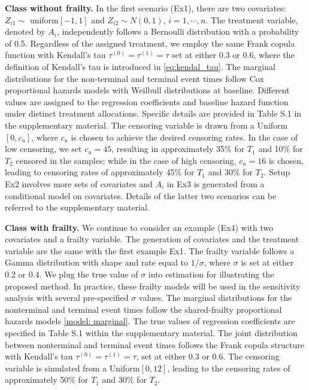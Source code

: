 \documentclass[APA,Times1COL]{WileyNJDv5} %
\theoremstyle{plain}
\begin{document}
\iffalse
\textbf{Class without frailty.}
In the first scenario (Ex1), there are two covariates:  $Z_{i1}\sim$ uniform$[-1,1]$ and $Z_{i2}\sim N(0,1)$, $i=1,\cdots,n$. The treatment variable, denoted by $A_i$, independently follows a Bernoulli distribution with a probability of 0.5. Regardless of the assigned treatment, we employ the same Frank copula function with Kendall's tau $\tau^{(0)}=\tau^{(1)}=\tau$ set at either 0.3 or 0.6, where the definition of Kendall's tau is introduced in \eqref{eq:kendal_tau}.  The marginal distributions for the non-terminal and terminal event times follow Cox proportional hazards models with Weilbull distributions at baseline. Different values are assigned to the regression coefficients and baseline hazard function under distinct treatment allocations. Specific details are provided in Table S.1 in the supplementary material. 
The censoring variable is drawn from a Uniform$[0, c_u]$, where $c_u$ is chosen to achieve the desired censoring rates. In the case of low censoring, we set $c_u=45$, resulting in approximately 35$\%$ for $T_1$ and 10$\%$ for $T_2$ censored in the samples; while in the case of high censoring, $c_u=16$ is chosen, leading to censoring rates of approximately 45$\%$ for $T_1$ and 30$\%$ for $T_2$. 
Setup Ex2 involves more sets of covariates and  $A_i$ in Ex3 is generated from a conditional model on covariates. Details of the latter two scenarios can be referred to the supplementary material.




\textbf{Class with frailty.} 
We continue to consider an example (Ex4) with two covariates and a frailty variable. The generation of covariates and the treatment variable are the same with the first example Ex1. The frailty variable follows a Gamma distribution with shape and rate equal to $1/\sigma$, where $\sigma$ is set at either 0.2 or 0.4. We plug the true value of $\sigma$ into estimation for illustrating the proposed method. In practice, these frailty models will be used in the sensitivity analysis with several pre-specified $\sigma$ values. The marginal distributions for the nonterminal and terminal event times follow the shared-frailty proportional hazards models \eqref{model: marginal}. The true values of regression coefficients are specified in Table S.1 within the supplementary material. The joint distribution between nonterminal and terminal event times follows the Frank copula structure with Kendall's tau $\tau^{(0)}=\tau^{(1)}=\tau$, set at either 0.3 or 0.6. The censoring variable is simulated from a Uniform$[0, 12]$, leading to the censoring rates of approximately 50$\%$ for $T_1$ and 30$\%$ for $T_2$. 
\end{document}
